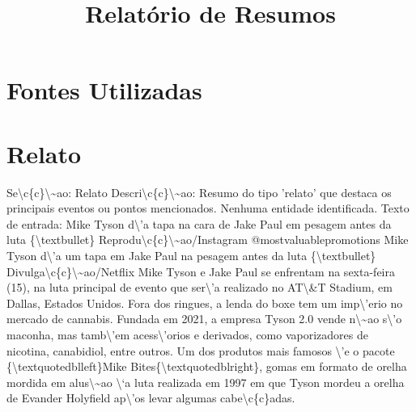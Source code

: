 \documentclass{article}%
\title{Relatório de Resumos}%
\begin{document}
%
\normalsize%
\maketitle%
\section{Fontes Utilizadas}%
\label{sec:FontesUtilizadas}%

%
\section{Relato}%
\label{sec:Relato}%
Se\textbackslash{}c\{c\}\textbackslash{}\textasciitilde{}ao: Relato\newline%
Descri\textbackslash{}c\{c\}\textbackslash{}\textasciitilde{}ao: Resumo do tipo 'relato' que destaca os principais eventos ou pontos mencionados.\newline%
\newline%
Nenhuma entidade identificada.\newline%
\newline%
Texto de entrada:\newline%
Mike Tyson d\textbackslash{}'a tapa na cara de Jake Paul em pesagem antes da luta\newline%
\{\textbackslash{}textbullet\} Reprodu\textbackslash{}c\{c\}\textbackslash{}\textasciitilde{}ao/Instagram @mostvaluablepromotions\newline%
\newline%
Mike Tyson d\textbackslash{}'a um tapa em Jake Paul na pesagem antes da luta\newline%
\{\textbackslash{}textbullet\} Divulga\textbackslash{}c\{c\}\textbackslash{}\textasciitilde{}ao/Netflix\newline%
\newline%
Mike Tyson e Jake Paul se enfrentam na sexta{-}feira (15), na luta principal de evento que ser\textbackslash{}'a realizado no AT\textbackslash{}\&T Stadium, em Dallas, Estados Unidos. Fora dos ringues, a lenda do boxe tem um imp\textbackslash{}'erio no mercado de cannabis.\newline%
\newline%
Fundada em 2021, a empresa Tyson 2.0 vende n\textbackslash{}\textasciitilde{}ao s\textbackslash{}'o maconha, mas tamb\textbackslash{}'em acess\textbackslash{}'orios e derivados, como vaporizadores de nicotina, canabidiol, entre outros. Um dos produtos mais famosos \textbackslash{}'e o pacote \{\textbackslash{}textquotedblleft\}Mike Bites\{\textbackslash{}textquotedblright\}, gomas em formato de orelha mordida em alus\textbackslash{}\textasciitilde{}ao \textbackslash{}`a luta realizada em 1997 em que Tyson mordeu a orelha de Evander Holyfield ap\textbackslash{}'os levar algumas cabe\textbackslash{}c\{c\}adas.\newline%
\end{document}
